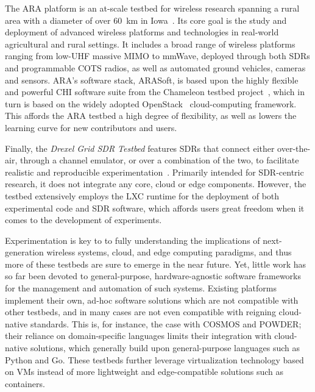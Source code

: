 The \gls{ARA} platform is an at-scale testbed for wireless research spanning a rural area with a diameter of over \SI{60}{\kilo\meter} in Iowa~\cite{zhang2022ara}.
Its core goal is the study and deployment of advanced wireless platforms and technologies in real-world agricultural and rural settings.
It includes a broad range of wireless platforms ranging from low-\gls{UHF} massive \gls{MIMO} to \unit{\milli\meter}Wave, deployed through both \acp{SDR} and programmable \gls{COTS} radios, as well as automated ground vehicles, cameras and sensors.
\gls{ARA}'s software stack, ARASoft, is based upon the highly flexible and powerful \gls{CHI} software suite from the Chameleon testbed project~\cite{keahey2020lessons}, which in turn is based on the widely adopted OpenStack~\cite{openstack} cloud-computing framework.
This affords the \gls{ARA} testbed a high degree of flexibility, as well as lowers the learning curve for new contributors and users.

Finally, the \emph{Drexel Grid \gls{SDR} Testbed} features \acp{SDR} that connect either over-the-air, through a channel emulator, or over a combination of the two, to facilitate realistic and reproducible experimentation~\cite{DrexelGrid}.
Primarily intended for \gls{SDR}-centric research, it does not integrate any core, cloud or edge components.
However, the testbed extensively employs the \gls{LXC} runtime for the deployment of both experimental code and \gls{SDR} software, which affords users great freedom when it comes to the development of experiments.

Experimentation is key to to fully understanding the implications of next-generation wireless systems, cloud, and edge computing paradigms, and thus more of these testbeds are sure to emerge in the near future.
Yet, little work has so far been devoted to general-purpose, hardware-agnostic software frameworks for the management and automation of such systems.
Existing platforms implement their own, ad-hoc software solutions which are not compatible with other testbeds, and in many cases are not even compatible with reigning cloud-native standards.
This is, for instance, the case with \gls{COSMOS} and \gls{POWDER}; their reliance on domain-specific languages limits their integration with cloud-native solutions, which generally build upon general-purpose languages such as Python and Go.
These testbeds further leverage virtualization technology based on \acp{VM} instead of more lightweight and edge-compatible solutions such as containers.

